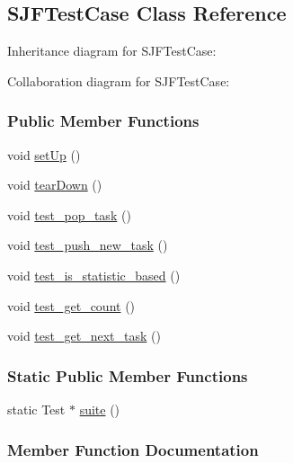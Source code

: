 \hypertarget{a00036}{}\subsection{S\+J\+F\+Test\+Case Class Reference}
\label{a00036}


Inheritance diagram for S\+J\+F\+Test\+Case\+:


Collaboration diagram for S\+J\+F\+Test\+Case\+:
\subsubsection*{Public Member Functions}
\begin{DoxyCompactItemize}
\item 
void \hyperlink{a00036_a60802b4d079974043d4e3baef703bcd1}{set\+Up} ()
\item 
void \hyperlink{a00036_a5d9d9367be49a961f6b4babce4fd1fa6}{tear\+Down} ()
\item 
void \hyperlink{a00036_a8a60cf0b180bbfa45cc87a390e9feea2}{test\+\_\+pop\+\_\+task} ()
\item 
void \hyperlink{a00036_acb01215c03c9c2d1d106c50256072128}{test\+\_\+push\+\_\+new\+\_\+task} ()
\item 
void \hyperlink{a00036_ad1e7aef024b053a300dbf57884e8e21b}{test\+\_\+is\+\_\+statistic\+\_\+based} ()
\item 
void \hyperlink{a00036_abdef7d1c7d5d42959626b05bb5cde82d}{test\+\_\+get\+\_\+count} ()
\item 
void \hyperlink{a00036_a7953aefbd4ff5f4af75b2de09e8bb91f}{test\+\_\+get\+\_\+next\+\_\+task} ()
\end{DoxyCompactItemize}
\subsubsection*{Static Public Member Functions}
\begin{DoxyCompactItemize}
\item 
static Test $\ast$ \hyperlink{a00036_ab7356943d18befb6e383b68857093503}{suite} ()
\end{DoxyCompactItemize}


\subsubsection{Member Function Documentation}
\hypertarget{a00036_a60802b4d079974043d4e3baef703bcd1}{}
